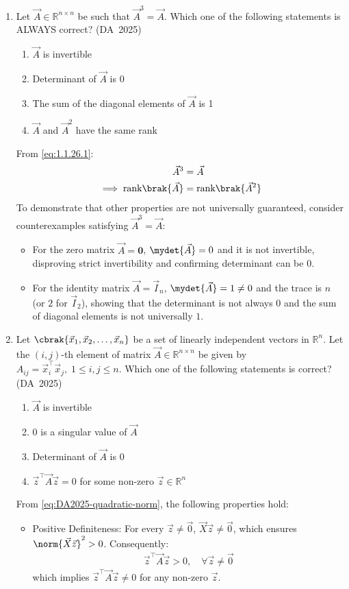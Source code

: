 \begin{enumerate}[label=\thesubsection.\arabic*, ref=\thesubsection.\theenumi]
\item 
Let $\vec{A} \in \mathbb{R}^{n \times n}$ be such that $\vec{A}^3 = \vec{A}$. Which one of the following statements is ALWAYS correct?
\hfill (DA~2025)
\begin{enumerate}
	\item $\vec{A}$ is invertible
	\item Determinant of $\vec{A}$ is 0
	\item The sum of the diagonal elements of $\vec{A}$ is 1
	\item $\vec{A}$ and $\vec{A}^2$ have the same rank
\end{enumerate}
\solution
From \eqref{eq:1.1.26.1}:
\begin{align}
	\vec{A}^3 &= \vec{A}
	\\
	\implies \text{rank}\brak{\vec{A}} &= \text{rank}\brak{\vec{A}^2}
\end{align}
To demonstrate that other properties are not universally guaranteed, consider counterexamples satisfying $\vec{A}^3 = \vec{A}$:
\begin{itemize}
	\item For the zero matrix $\vec{A} = \mathbf{0}$, $\mydet{\vec{A}} = 0$ and it is not invertible, disproving strict invertibility and confirming determinant can be $0$.
	\item For the identity matrix $\vec{A} = \vec{I}_n$, $\mydet{\vec{A}} = 1 \neq 0$ and the trace is $n$ (or $2$ for $\vec{I}_2$), showing that the determinant is not always $0$ and the sum of diagonal elements is not universally $1$.
\end{itemize}
	
\item 
Let $\cbrak{\vec{x}_1, \vec{x}_2, \dots, \vec{x}_n}$ be a set of linearly independent vectors in $\mathbb{R}^n$. Let the $(i, j)$-th element of matrix $\vec{A} \in \mathbb{R}^{n \times n}$ be given by $A_{ij} = \vec{x}_i^{\top}\vec{x}_j, \; 1 \le i, j \le n$. Which one of the following statements is correct?
\hfill (DA~2025)
\begin{enumerate}
	\item $\vec{A}$ is invertible
	\item 0 is a singular value of $\vec{A}$
	\item Determinant of $\vec{A}$ is 0
	\item $\vec{z}^{\top}\vec{A}\vec{z} = 0$ for some non-zero $\vec{z} \in \mathbb{R}^n$
\end{enumerate}
\solution
From \eqref{eq:DA2025-quadratic-norm}, the following properties hold:
\begin{itemize}
	\item Positive Definiteness: For every $\vec{z} \neq \vec{0}$, $\vec{X}\vec{z} \neq \vec{0}$, which ensures $\norm{\vec{X}\vec{z}}^2 > 0$. Consequently:
	\begin{align}
		\vec{z}^{\top}\vec{A}\vec{z} > 0, \quad \forall \vec{z} \neq \vec{0}
	\end{align}
	which implies $\vec{z}^{\top}\vec{A}\vec{z} \neq 0$ for any non-zero $\vec{z}$.
	

\end{itemize}
\end{enumerate}
